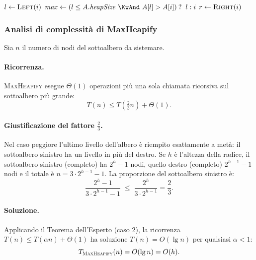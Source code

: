\begin{algorithm}[H]
	\caption{\textsc{MaxHeapify}$(A, i)$}
	$l \gets \textsc{Left}(i)$\;
	$\mathit{max} \gets (l \le A.\mathit{heapSize}\ \KwAnd\ A[l] > A[i])
	\mathbin{?}\ l : i$
	$r \gets \textsc{Right}(i)$\;
\end{algorithm}

\subsubsection{Analisi di complessità di MaxHeapify}

Sia $n$ il numero di nodi del sottoalbero da sistemare.

\paragraph{Ricorrenza.}
\textsc{MaxHeapify} esegue $\Theta(1)$ operazioni più una sola chiamata
ricorsiva sul sottoalbero più grande:
\[
T(n) \le T\!\left(\tfrac{2}{3}n\right) + \Theta(1).
\]

\paragraph{Giustificazione del fattore $\frac{2}{3}$.}
Nel caso peggiore l'ultimo livello dell'albero è riempito esattamente
a metà: il sottoalbero sinistro ha un livello in più del destro. Se
$h$ è l'altezza della radice, il sottoalbero sinistro (completo) ha
$2^h - 1$ nodi, quello destro (completo) $2^{h-1} - 1$ nodi e
il totale è $n = 3 \cdot 2^{h-1} - 1$. La proporzione del sottoalbero
sinistro è:
\[
\frac{2^h - 1}{3 \cdot 2^{h-1} - 1}
\;\le\; \frac{2^h}{3 \cdot 2^{h-1}}
= \frac{2}{3}.
\]

\paragraph{Soluzione.}
Applicando il Teorema dell'Esperto (caso 2), la ricorrenza
$T(n) \le T\!\left(\alpha n\right) + \Theta(1)$ ha soluzione
$T(n) = O(\lg n)$ per qualsiasi $\alpha < 1$:
\[
T_{\textsc{MaxHeapify}}(n) = O(\lg n) = O(h).
\]

